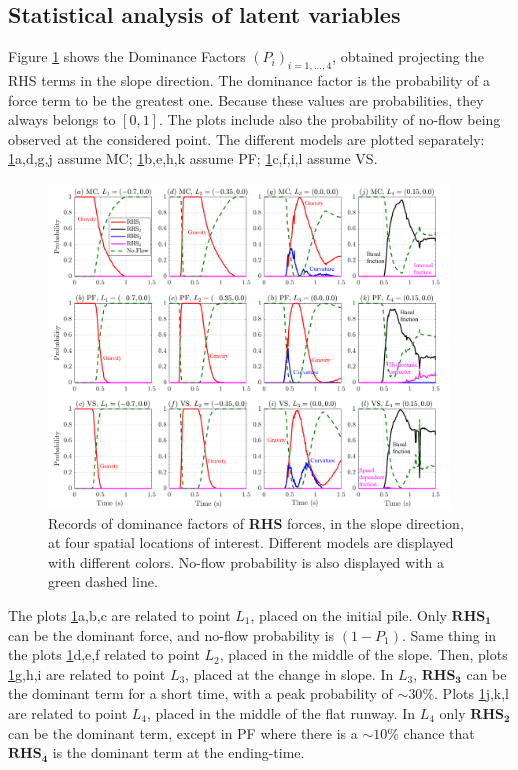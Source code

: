\documentclass{article}
\begin{document}
\subsection{Statistical analysis of latent variables}\label{Hq1}
Figure \ref{fig:Ramp-Pr_x} shows the Dominance Factors $(P_i)_{i=1,\dots,4}$, obtained projecting the RHS terms in the slope direction. The dominance factor is the probability of a force term to be the greatest one. Because these values are probabilities, they always belongs to $[0,1]$. The plots include also the probability of no-flow being observed at the considered point. The different models are plotted separately: \ref{fig:Ramp-Pr_x}a,d,g,j assume MC; \ref{fig:Ramp-Pr_x}b,e,h,k assume PF; \ref{fig:Ramp-Pr_x}c,f,i,l assume VS.
\begin{figure}[H]
         \centering
        \includegraphics[width=0.95\textwidth]{InclinedPlane/ForceContrib/Pr_x.png}
        \caption{Records of dominance factors of \textbf{RHS} forces, in the slope direction, at four spatial locations of interest. Different models are displayed with different colors. No-flow probability is also displayed with a green dashed line.}
        \label{fig:Ramp-Pr_x}
\end{figure}
The plots \ref{fig:Ramp-Pr_x}a,b,c are related to point $L_1$, placed on the initial pile. Only $\boldsymbol{RHS_1}$ can be the dominant force, and no-flow probability is $(1-P_1)$. Same thing in the plots \ref{fig:Ramp-Pr_x}d,e,f related to point $L_2$, placed in the middle of the slope. Then, plots \ref{fig:Ramp-Pr_x}g,h,i are related to point $L_3$, placed at the change in slope. In $L_3$, $\boldsymbol{RHS_3}$ can be the dominant term for a short time, with a peak probability of $\sim 30\%$. Plots \ref{fig:Ramp-Pr_x}j,k,l are related to point $L_4$, placed in the middle of the flat runway. In $L_4$ only $\boldsymbol{RHS_2}$ can be the dominant term, except in PF where there is a $\sim 10\%$ chance that $\boldsymbol{RHS_4}$ is the dominant term at the ending-time.
\end{document}
